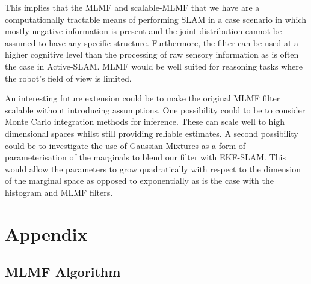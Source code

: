 \documentclass{frontiersSCNS} %
\begin{document}
This implies that the MLMF and scalable-MLMF that we have are a computationally tractable means of 
performing SLAM in a case scenario in which mostly negative information is present and the 
joint distribution cannot be assumed to have any specific structure. Furthermore, the filter can be used at a higher cognitive level than 
the processing of raw sensory information as is often the case in Active-SLAM. MLMF would be well suited for reasoning tasks 
where the robot's field of view is limited.

An interesting future extension could be to make the original MLMF filter scalable without introducing assumptions.
One possibility could to be to consider Monte Carlo integration methods for inference. These can scale well to high dimensional 
spaces whilst still providing reliable estimates. A second possibility could be to investigate the use of Gaussian Mixtures as a 
form of parameterisation of the marginals to blend our filter with EKF-SLAM. This would allow the parameters 
to grow quadratically with respect to the dimension of the marginal space as opposed to exponentially as is the case 
with the histogram and MLMF filters.

\section{Appendix}

\subsection{MLMF Algorithm}\label{app:alg:mlmf}
\end{document}
